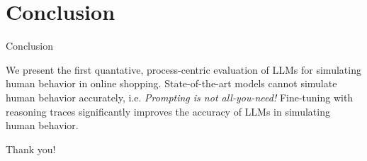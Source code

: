 \documentclass[scheme=plain]{beamer}
\begin{document}
\section{Conclusion}

\begin{frame}{Conclusion}
  \begin{outline}
    \1 We present the first quantative, process-centric evaluation of LLMs for simulating human behavior in online shopping.
    \1 State-of-the-art models cannot simulate human behavior accurately, i.e. \textit{Prompting is not all-you-need!}
    \1 Fine-tuning with reasoning traces significantly improves the accuracy of LLMs in simulating human behavior.
  \end{outline}
\end{frame}

\begin{frame}[standout]
  Thank you!
\end{frame}
\end{document}
